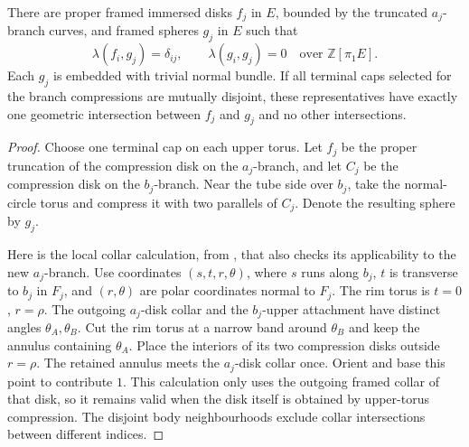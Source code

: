\begin{lemma}
\label{ch:exterior-duals}
There are proper framed immersed disks $f_j$ in $E$, bounded by
the truncated $a_j$-branch curves, and framed spheres $g_j$ in $E$
such that
\begin{equation}
\label{ch:dual-pairings}
 \lambda(f_i,g_j)=\delta_{ij},\qquad
 \lambda(g_i,g_j)=0
 \quad\text{over }\mathbb Z[\pi_1E].
\end{equation}
Each $g_j$ is embedded with trivial normal bundle.  If all terminal
caps selected for the branch compressions are mutually disjoint,
these representatives have exactly one geometric intersection
between $f_j$ and $g_j$ and no other intersections.
\end{lemma}

\begin{proof}
Choose one terminal cap on each upper torus.  Let $f_j$ be the
proper truncation of the compression disk on the $a_j$-branch, and
let $C_j$ be the compression disk on the $b_j$-branch.  Near the
tube side over $b_j$, take the normal-circle torus and compress it
with two parallels of $C_j$.  Denote the resulting sphere by $g_j$.

Here is the local collar calculation, from
\cite[Lemma~2.4]{MT}, that also checks its applicability to the
new $a_j$-branch.  Use coordinates $(s,t,r,\theta)$, where $s$
runs along $b_j$, $t$ is transverse to $b_j$ in $F_j$, and
$(r,\theta)$ are polar coordinates normal to $F_j$.  The rim
torus is $t=0$, $r=\rho$.  The outgoing $a_j$-disk collar and
the $b_j$-upper attachment have distinct angles
$\theta_A,\theta_B$.  Cut the rim torus at a narrow band around
$\theta_B$ and keep the annulus containing $\theta_A$.  Place
the interiors of its two compression disks outside $r=\rho$.
The retained annulus meets the $a_j$-disk collar once.  Orient
and base this point to contribute $1$.  This calculation only
uses the outgoing framed collar of that disk, so it remains
valid when the disk itself is obtained by upper-torus compression.
The disjoint body neighbourhoods exclude collar intersections
between different indices.


\end{proof}
